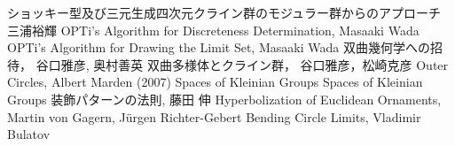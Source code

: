{\begin{thebibliography}{99}
        ショッキー型及び三元生成四次元クライン群のモジュラー群からのアプローチ
        三浦裕輝
        OPTi's Algorithm for Discreteness Determination,
        Masaaki Wada
        OPTi's Algorithm for Drawing the Limit Set,
        Masaaki Wada
        双曲幾何学への招待，
        谷口雅彦, 奥村善英
        双曲多様体とクライン群，
        谷口雅彦，松崎克彦
        Outer Circles, Albert Marden (2007)
        Spaces of Kleinian Groups
        Spaces of Kleinian Groups
        装飾パターンの法則,
        藤田 伸
        Hyperbolization of Euclidean Ornaments,
        Martin von Gagern, Jürgen Richter-Gebert
        Bending Circle Limits,
        Vladimir Bulatov
\end{thebibliography}
}